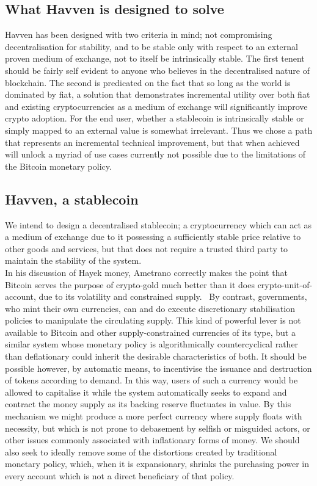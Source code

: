 \subsection{What Havven is designed to solve}

\noindent Havven has been designed with two criteria in mind; not compromising decentralisation for stability, and to be stable only with respect to an external proven medium of exchange, not to itself be intrinsically stable. The first tenent should be fairly self evident to anyone who believes in the decentralised nature of blockchain. The second is predicated on the fact that so long as the world is dominated by fiat, a solution that demonstrates incremental utility over both fiat and existing cryptocurrencies as a medium of exchange will significantly improve crypto adoption. For the end user, whether a stablecoin is intrinsically stable or simply mapped to an external value is somewhat irrelevant. Thus we chose a path that represents an incremental technical improvement, but that when achieved will unlock a myriad of use cases currently not possible due to the limitations of the Bitcoin monetary policy. \\

\subsection{Havven, a stablecoin}

\noindent We intend to design a decentralised stablecoin; a cryptocurrency which can act as a medium of exchange due to it possessing a sufficiently stable price relative to other goods and services, but that does not require a trusted third party to maintain the stability of the system.\\

\noindent  In his discussion of Hayek money, Ametrano correctly makes the point that Bitcoin serves the purpose of crypto-gold much better than it does crypto-unit-of-account, due to its volatility and constrained supply.~\cite{ametrano2016hayek} By contrast, governments, who mint their own currencies, can and do execute discretionary stabilisation policies to manipulate the circulating supply. This kind of powerful lever is not available to Bitcoin and other supply-constrained currencies of its type, but a similar system whose monetary policy is algorithmically countercyclical rather than deflationary could inherit the desirable characteristics of both. It should be possible however, by automatic means, to incentivise the issuance and destruction of tokens according to demand. In this way, users of such a currency would be allowed to capitalise it while the system automatically seeks to expand and contract the money supply as its backing reserve fluctuates in value. By this mechanism we might produce a more perfect currency where supply floats with necessity, but which is not prone to debasement by selfish or misguided actors, or other issues commonly associated with inflationary forms of money. We should also seek to ideally remove some of the distortions created by traditional monetary policy, which, when it is expansionary, shrinks the purchasing power in every account which is not a direct beneficiary of that policy.\\

